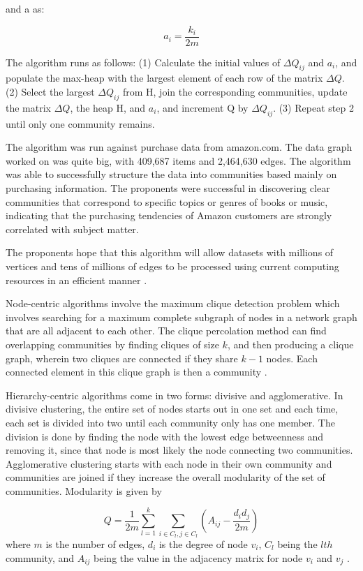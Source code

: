 and a as:


\begin{equation}
a_i = \frac{k_i}{2m}
\end{equation}


The algorithm runs as follows:
(1) Calculate the initial values of $\Delta Q_{ij}$ and $a_{i}$, and populate the max-heap with the largest element of each row of the matrix $\Delta Q$.
(2) Select the largest $\Delta Q_{ij}$ from H, join the corresponding
communities, update the matrix $\Delta Q$, the heap H, and $a_{i}$, and increment Q by $\Delta Q_{ij}$.
(3) Repeat step 2 until only one community remains.


The algorithm was run against purchase data from amazon.com. The data graph worked on was quite big, with 409,687 items and 2,464,630 edges. The algorithm was able to successfully structure the data into communities based mainly on purchasing information. The proponents were successful in discovering clear communities that correspond to specific topics or genres of books or music, indicating that the purchasing tendencies of Amazon customers are strongly correlated with subject matter.


The proponents hope that this algorithm will allow datasets with millions of vertices and tens of millions of edges to be processed using current computing resources in an efficient manner \cite{Clauset:2004}.


Node-centric algorithms involve the maximum clique detection problem which involves searching for a maximum complete subgraph of nodes in a network graph that are all adjacent to each other. The clique percolation method can find overlapping communities by finding cliques of size $k$, and then producing a clique graph, wherein two cliques are connected if they share $k-1$ nodes. Each connected element in this clique graph is then a community \cite{Tang:2010}.


Hierarchy-centric algorithms come in two forms: divisive and agglomerative. In divisive clustering, the entire set of nodes starts out in one set and each time, each set is divided into two until each community only has one member. The division is done by finding the node with the lowest edge betweenness and removing it, since that node is most likely the node connecting two communities. Agglomerative clustering starts with each node in their own community and communities are joined if they increase the overall modularity of the set of communities. Modularity is given by


\begin{equation}
Q = \frac{1}{2m} \sum_{l = 1}^{k} \sum_{i \in C_l, j \in C_l} (A_{ij} - \frac{d_i d_j}{2m})
\end{equation}where $m$ is the number of edges, $d_i$ is the degree of node $v_i$, $C_l$ being the $lth$ community, and $A_{ij}$ being the value in the adjacency matrix for node $v_i$ and $v_j$ \cite{Tang:2010} .


